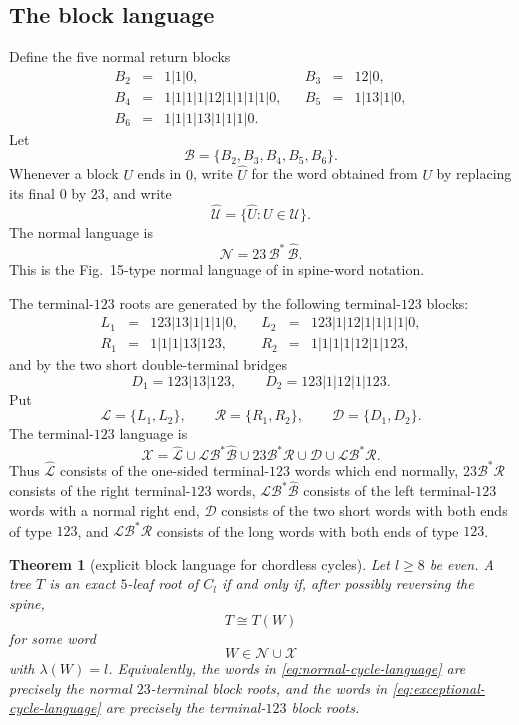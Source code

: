 \documentclass[11pt]{article}
\newtheorem{theorem}{Theorem}[section]
\theoremstyle{definition}
\begin{document}
\subsection*{The block language}

Define the five normal return blocks
\[
\begin{array}{rclcrcl}
B_2&=&1|1|0,&&
B_3&=&12|0,\\[1mm]
B_4&=&1|1|1|1|12|1|1|1|1|0,&&
B_5&=&1|13|1|0,\\[1mm]
B_6&=&1|1|1|13|1|1|1|0.&&&
\end{array}
\]
Let
\[
 \mathcal B=\{B_2,B_3,B_4,B_5,B_6\}.
\]
Whenever a block $U$ ends in $0$, write $\widehat U$ for the word obtained from $U$ by replacing its final $0$ by $23$, and write
\[
 \widehat{\mathcal U}=\{\widehat U:U\in\mathcal U\}.
\]
The normal language is
\begin{equation}\label{eq:normal-cycle-language}
 \mathcal N=23\,\mathcal B^{*}\,\widehat{\mathcal B}.
\end{equation}
This is the Fig.~15-type normal language of \cite{BLR2010} in spine-word notation.

The terminal-$123$ roots are generated by the following terminal-$123$ blocks:
\[
\begin{array}{rclcrcl}
L_1&=&123|13|1|1|1|0,&&
L_2&=&123|1|12|1|1|1|1|0,\\[1mm]
R_1&=&1|1|1|13|123,&&
R_2&=&1|1|1|1|12|1|123,
\end{array}
\]
and by the two short double-terminal bridges
\[
D_1=123|13|123,
\qquad
D_2=123|1|12|1|123.
\]
Put
\[
 \mathcal L=\{L_1,L_2\},
 \qquad
 \mathcal R=\{R_1,R_2\},
 \qquad
 \mathcal D=\{D_1,D_2\}.
\]
The terminal-$123$ language is
\begin{equation}\label{eq:exceptional-cycle-language}
\mathcal X=
\widehat{\mathcal L}
\cup
\mathcal L\mathcal B^{*}\widehat{\mathcal B}
\cup
23\mathcal B^{*}\mathcal R
\cup
\mathcal D
\cup
\mathcal L\mathcal B^{*}\mathcal R.
\end{equation}
Thus $\widehat{\mathcal L}$ consists of the one-sided terminal-$123$ words which end normally, $23\mathcal B^{*}\mathcal R$ consists of the right terminal-$123$ words, $\mathcal L\mathcal B^{*}\widehat{\mathcal B}$ consists of the left terminal-$123$ words with a normal right end, $\mathcal D$ consists of the two short words with both ends of type $123$, and $\mathcal L\mathcal B^{*}\mathcal R$ consists of the long words with both ends of type $123$.

\begin{theorem}[explicit block language for chordless cycles]\label{thm:cycle-block-language}
Let $l\ge8$ be even.  A tree $T$ is an exact $5$-leaf root of $C_l$ if and only if, after possibly reversing the spine,
\[
 T\cong T(W)
\]
for some word
\[
 W\in\mathcal N\cup\mathcal X
\]
with $\lambda(W)=l$.
Equivalently, the words in \eqref{eq:normal-cycle-language} are precisely the normal $23$-terminal block roots, and the words in \eqref{eq:exceptional-cycle-language} are precisely the terminal-$123$ block roots.
\end{theorem}
\end{document}
